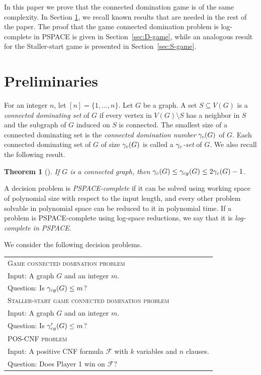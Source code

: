 \documentclass[12pt]{article}
\newtheorem{theorem}{Theorem}[section]
\newcommand{\gcg}{\gamma_{\rm cg}}
\newcommand{\gc}{\gamma_{\rm c}}
\newcommand{\F}{\mathcal{F}}
\begin{document}
In this paper we prove that the connected domination game is of the same complexity. In Section \ref{sec:prelim}, we recall known results that are needed in the rest of the paper. The proof that the game connected domination problem is log-complete in PSPACE is given in Section~\ref{sec:D-game}, while an analogous result for the Staller-start game is presented in Section~\ref{sec:S-game}.


\section{Preliminaries}
\label{sec:prelim}

For an integer $n$, let $[n] = \{1,\ldots,n\}$.
Let $G$ be a graph. A set $S \subseteq V(G)$ is a \emph{connected dominating set} of $G$ if every vertex in $V(G) \setminus S$ has a neighbor in $S$ and the subgraph of $G$ induced on $S$ is connected. The smallest size of a connected dominating set is the \emph{connected domination number} $\gc(G)$ of $G$. Each connected dominating set of $G$ of size $\gc(G)$ is called a \emph{$\gc$-set} of $G$. We also recall the following result.

\begin{theorem}[{\cite[Theorem 1]{borowiecki+2019connected}}]
	\label{thm:basic}
	If $G$ is a connected graph, then $\gc(G) \leq \gcg(G) \leq 2 \gc(G) - 1$.
\end{theorem}

A decision problem is \emph{PSPACE-complete} if it can be solved using working space of polynomial size with respect to the input length, and every other problem solvable in polynomial space can be reduced to it in polynomial time. If a problem is PSPACE-complete using log-space reductions, we say that it is \emph{log-complete in PSPACE}.

We consider the following decision problems.

\begin{center}
	\begin{tabular}{l}
		\textsc{Game connected domination problem}\\
		Input: A graph $G$ and an integer $m$.\\ \vspace{0.5cm}
		Question: Is $\gcg(G) \leq m$?\\
		
		\textsc{Staller-start game connected domination problem}\\
		Input: A graph $G$ and an integer $m$.\\ \vspace{0.5cm}
		Question: Is $\gcg'(G) \leq m$?\\
		
		\textsc{POS-CNF problem}\\
		Input: A positive CNF formula $\F$ with $k$ variables and $n$ clauses.\\
		Question: Does Player 1 win on $\F$?
	\end{tabular}
\end{center}
\end{document}
